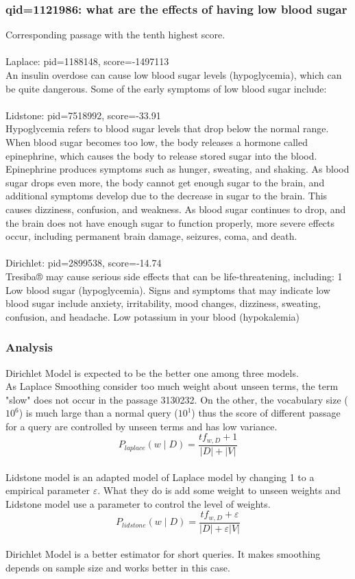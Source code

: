 \subsubsection{qid=1121986: what are the effects of having low blood sugar}
Corresponding passage with the tenth highest score.
\\\\
Laplace: pid=1188148, score=-1497113
\\
An insulin overdose can cause low blood sugar levels (hypoglycemia), which can be quite dangerous. Some of the early symptoms of low blood sugar include:
\\\\
Lidstone: pid=7518992, score=-33.91
\\
Hypoglycemia refers to blood sugar levels that drop below the normal range. When blood sugar becomes too low, the body releases a hormone called epinephrine, which causes the body to release stored sugar into the blood. Epinephrine produces symptoms such as hunger, sweating, and shaking. As blood sugar drops even more, the body cannot get enough sugar to the brain, and additional symptoms develop due to the decrease in sugar to the brain. This causes dizziness, confusion, and weakness. As blood sugar continues to drop, and the brain does not have enough sugar to function properly, more severe effects occur, including permanent brain damage, seizures, coma, and death.
\\\\
Dirichlet: pid=2899538, score=-14.74
\\
Tresiba® may cause serious side effects that can be life-threatening, including: 1  Low blood sugar (hypoglycemia). Signs and symptoms that may indicate low blood sugar include anxiety, irritability, mood changes, dizziness, sweating, confusion, and headache.  Low potassium in your blood (hypokalemia)
\subsubsection{Analysis}
Dirichlet Model is expected to be the better one among three models. 
\\
As Laplace Smoothing consider too much weight about unseen terms, the term "slow" does not occur in the passage 3130232. On the other, the vocabulary size ($10^6$) is much large than a normal query ($10^1$) thus the score of different passage for a query are controlled by unseen terms and has low variance.
\begin{equation}
    P_{laplace}(w \mid D)=\frac{t f_{w, D}+1}{|D|+|V|}
\end{equation}
\\
Lidstone model is an adapted model of Laplace model by changing 1 to a empirical parameter $\varepsilon$. What they do is add some weight to unseen weights and Lidstone model use a parameter to control the level of weights.
\begin{equation}
    P_{lidstone}(w \mid D)=\frac{t f_{w, D}+\varepsilon}{|D|+\varepsilon|V|}
\end{equation}
\\
Dirichlet Model is a better estimator for short queries. It makes smoothing depends on sample size and works better in this case.
